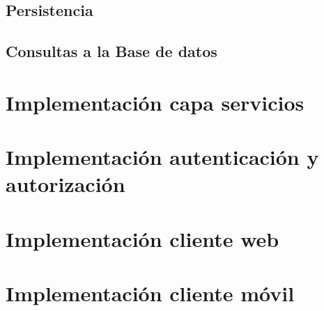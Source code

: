 \subsection{Persistencia}


\subsection{Consultas a la Base de datos}


\section{Implementación capa servicios}


\section{Implementación autenticación y autorización}


\section{Implementación cliente web}


\section{Implementación cliente móvil}
